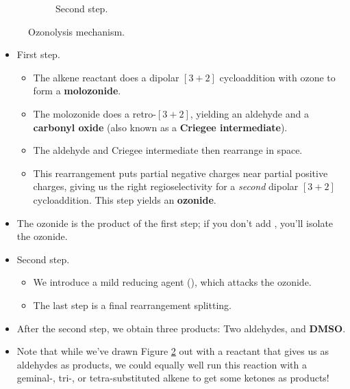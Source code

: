 \documentclass[../notes.tex]{subfiles}
\begin{document}
\begin{itemize}
\begin{figure}[H]
\begin{subfigure}[b]{\linewidth}
            \schemestop
            \chemnameinit{}
            \caption{Second step.}
            \label{fig:mechOzonolysisb}
        \end{subfigure}
        \caption{Ozonolysis mechanism.}
        \label{fig:mechOzonolysis}
    \end{figure}
    \begin{itemize}
        \item First step.
        \begin{itemize}
            \item The alkene reactant does a dipolar $[3+2]$ cycloaddition with ozone to form a \textbf{molozonide}.
            \item The molozonide does a retro-$[3+2]$, yielding an aldehyde and a \textbf{carbonyl oxide} (also known as a \textbf{Criegee intermediate}).
            \item The aldehyde and Criegee intermediate then rearrange in space.
            \item This rearrangement puts partial negative charges near partial positive charges, giving us the right regioselectivity for a \emph{second} dipolar $[3+2]$ cycloaddition. This step yields an \textbf{ozonide}.
        \end{itemize}
        \item The ozonide is the product of the first step; if you don't add , you'll isolate the ozonide.
        \item Second step.
        \begin{itemize}
            \item We introduce a mild reducing agent (), which attacks the ozonide.
            \item The last step is a final rearrangement splitting.
        \end{itemize}
        \item After the second step, we obtain three products: Two aldehydes, and \textbf{DMSO}.
        \item Note that while we've drawn Figure \ref{fig:mechOzonolysis} out with a reactant that gives us as aldehydes as products, we could equally well run this reaction with a geminal-, tri-, or tetra-substituted alkene to get some ketones as products!

\end{itemize}
\end{itemize}
\end{document}
